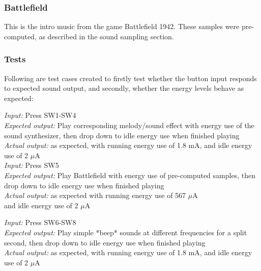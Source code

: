 \subsubsection{Battlefield}

This is the intro music from the game Battlefield 1942. These samples were pre-computed, as described in the sound sampling section. 

\subsubsection{Tests}

Following are test cases created to firstly test whether the button input responds to expected sound output, and secondly, whether the energy levels behave as expected:



\emph{Input: } Press SW1-SW4\\
\emph{Expected output: } Play corresponding melody/sound effect with energy use of the sound synthesizer, then drop down to idle energy use when finished playing\\
\emph{Actual output: } as expected, with running energy use of 1.8 mA, and idle energy use of 2 $\mu$A \\


\emph{Input: } Press SW5\\
\emph{Expected output: } Play Battlefield with energy use of pre-computed samples, then drop down to idle energy use when finished playing\\
\emph{Actual output: } as expected with running energy use of 567 $\mu$A \\ and idle energy use of 2 $\mu$A \

\emph{Input: } Press SW6-SW8\\
\emph{Expected output: } Play simple *beep* sounds at different frequencies for a split second, then drop down to idle energy use when finished playing\\
\emph{Actual output: } as expected, with running energy use of 1.8 mA, and idle energy use of 2 $\mu$A \\

